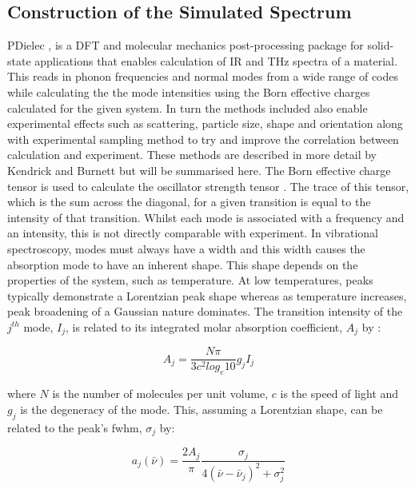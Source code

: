 \subsection{Construction of the Simulated Spectrum}
\label{subsec:pdielec}
PDielec \DIFdelbegin \DIFdel{~}\DIFdelend \cite{Kendrick2016}, is a DFT and molecular mechanics post\nobreakdash-processing package for solid\nobreakdash-state applications that enables calculation of IR and THz spectra of a material. This reads in phonon frequencies and normal modes from a wide range of codes while calculating the the mode intensities using the Born effective charges calculated for the given system. In turn the methods included also enable experimental effects such as scattering, particle size, shape and orientation along with experimental sampling method to try and improve the correlation between calculation and experiment. These methods are described in more \DIFaddbegin {}\DIFaddend detail by Kendrick and Burnett \DIFdelbegin \DIFdel{~}\DIFdelend \cite{Kendrick2016, Kendrick2020, john_kendrick_2022_5888313} but will be summarised here. The Born effective charge tensor is used to calculate the oscillator strength tensor \DIFdelbegin \DIFdel{~}\DIFdelend \cite{Gonze1997}. The trace of this tensor, which is the sum across the diagonal, for a given transition is equal to the intensity of that transition.
Whilst each mode is associated with a frequency and an intensity, this is not directly comparable with experiment. In vibrational spectroscopy, modes must always have a width and this width causes the absorption mode to have an inherent shape. This shape depends on the properties of the system, such as temperature. At low temperatures, peaks typically demonstrate a Lorentzian peak shape whereas as temperature increases, peak broadening of a Gaussian nature dominates. The transition intensity of the \(j^{th}\) mode, \(I_j\), is related to its integrated molar absorption coefficient, \(A_j\) by \DIFdelbegin \DIFdel{~}\DIFdelend \cite{Wilson1955}:

\begin{equation}
A_j = \frac{N \pi}{3 c^2 log_e 10} g_j I_j
\end{equation}

where \(N\) is the number of molecules per unit volume, \(c\) is the speed of light and \(g_j\) is the degeneracy of the mode. This, assuming a Lorentzian shape, can be related to the peak's \acrfull{fwhm}, \(\sigma_j\) by:

\begin{equation}
a_j(\bar{\nu}) = \frac{2 A_j}{\pi} \frac{\sigma_j}{4(\bar{\nu} - \bar{\nu}_j)^2 + \sigma_j^2}
\end{equation}

